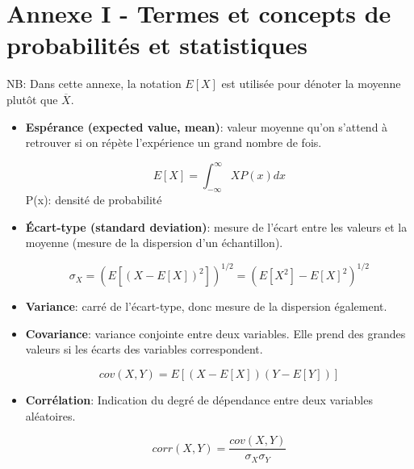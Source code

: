 \documentclass{article}       %
\begin{document}
\newpage

\section*{Annexe I - Termes et concepts de probabilités et statistiques}
\label{AnnexeI}

NB: Dans cette annexe, la notation $E[X]$ est utilisée pour dénoter la moyenne plutôt que $\overline{X}$.

\begin{itemize}
    \item \textbf{Espérance (expected value, mean)}: valeur moyenne qu'on s'attend à retrouver si on répète l'expérience un grand nombre de fois.
    
    \begin{equation*}
        E[X] = \int_{-\infty}^{\infty}X P(x) dx
    \end{equation*}
    P(x): densité de probabilité\\
    
    
    \item \textbf{Écart-type (standard deviation)}: mesure de l'écart entre les valeurs et la moyenne (mesure de la dispersion d'un échantillon).
    
    \begin{equation*}
        \sigma_X = \left(E[(X - E[X])^2]\right)^{1/2} = \left(E[X^2]-E[X]^2\right)^{1/2}
    \end{equation*}
    
    \bigskip
    
    
    \item\textbf{Variance}: carré de l'écart-type, donc mesure de la dispersion également.\\
    
    \item\textbf{Covariance}: variance conjointe entre deux variables. Elle prend des grandes valeurs si les écarts des variables correspondent.
    
    \begin{equation*}
        cov(X,Y) = E[(X-E[X])(Y-E[Y])]
    \end{equation*}
    
    \bigskip
    
    \item\textbf{Corrélation}: Indication du degré de dépendance entre deux variables aléatoires.
    
    \begin{equation*}
        corr(X,Y) = \frac{cov(X,Y)}{\sigma_{X}\sigma_{Y}}
    \end{equation*}
    

\end{itemize}
\end{document}

